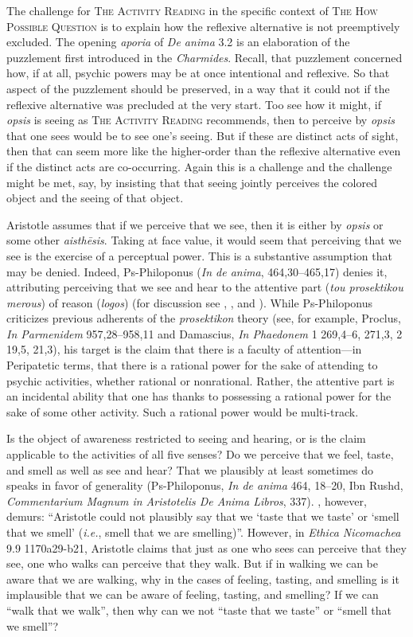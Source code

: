 The challenge for \textsc{The Activity Reading} in the specific context of \textsc{The How Possible Question} is to explain how the reflexive alternative is not preemptively excluded. The opening \emph{aporia} of \emph{De anima} 3.2 is an elaboration of the puzzlement first introduced in the \emph{Charmides}. Recall, that puzzlement concerned how, if at all, psychic powers may be at once intentional and reflexive. So that aspect of the puzzlement should be preserved, in a way that it could not if the reflexive alternative was precluded at the very start. Too see how it might, if \emph{opsis} is seeing as \textsc{The Activity Reading} recommends, then to perceive by \emph{opsis} that one sees would be to see one's seeing. But if these are distinct acts of sight, then that can seem more like the higher-order than the reflexive alternative even if the distinct acts are co-occurring. Again this is a challenge and the challenge might be met, say, by insisting that that seeing jointly perceives the colored object and the seeing of that object.

Aristotle assumes that if we perceive that we see, then it is either by \emph{opsis} or some other \emph{aisthēsis}. Taking at face value, it would seem that perceiving that we see is the exercise of a perceptual power. This is a substantive assumption that may be denied. Indeed, Ps-Philoponus (\emph{In de anima}, 464,30–465,17) denies it, attributing perceiving that we see and hear to the attentive part (\emph{tou prosektikou merous}) of reason (\emph{logos}) (for discussion see \citealt{Bernard:1987hc}, \citealt{Lautner:1994cs}, and \citealt{Lautner:2014cz}). While Ps-Philoponus criticizes previous adherents of the \emph{prosektikon} theory (see, for example, Proclus, \emph{In Parmenidem} 957,28–958,11 and Damascius, \emph{In Phaedonem} 1 269,4–6, 271,3, 2 19,5, 21,3), his target is the claim that there is a faculty of attention—in Peripatetic terms, that there is a rational power for the sake of attending to psychic activities, whether rational or nonrational. Rather, the attentive part is an incidental ability that one has thanks to possessing a rational power for the sake of some other activity. Such a rational power would be multi-track.

Is the object of awareness restricted to seeing and hearing, or is the claim applicable to the activities of all five senses? Do we perceive that we feel, taste, and smell as well as see and hear? That we plausibly at least sometimes do speaks in favor of generality (Ps-Philoponus, \emph{In de anima} 464, 18–20, Ibn Rushd, \emph{Commentarium Magnum in Aristotelis De Anima Libros}, 337). \citet[779 n59]{caston02}, however, demurs: ``Aristotle could not plausibly say that we `taste that we taste' or `smell that we smell' (\emph{i.e.}, smell that we are smelling)''. However, in \emph{Ethica Nicomachea} 9.9 1170a29-b21, Aristotle claims that just as one who sees can perceive that they see, one who walks can perceive that they walk. But if in walking we can be aware that we are walking, why in the cases of feeling, tasting, and smelling is it implausible that we can be aware of feeling, tasting, and smelling? If we can ``walk that we walk'', then why can we not ``taste that we taste'' or ``smell that we smell''?

